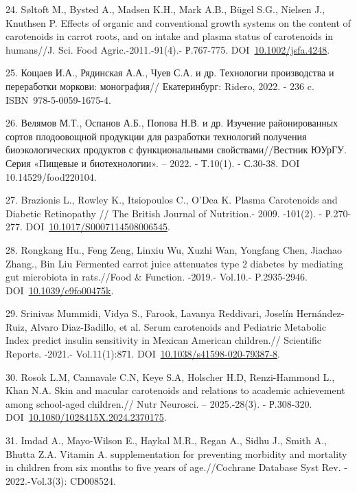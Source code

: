 24. Søltoft M., Bysted A., Madsen K.H., Mark A.B., Bügel S.G., Nielsen
J., Knuthsen P. Effects of organic and conventional growth systems on
the content of carotenoids in carrot roots, and on intake and plasma
status of carotenoids in humans//J. Sci. Food Agric.-2011.-91(4).-
Р.767-775.
DOI~\href{https://doi.org/10.1002/jsfa.4248}{10.1002/jsfa.4248}.

25. Кощаев И.А., Рядинская А.А., Чуев С.А. и др. Технологии производства
и переработки моркови: монография// Екатеринбург: Ridero, 2022. - 236 c.
ISBN~978-5-0059-1675-4.

26. Велямов М.Т., Оспанов А.Б., Попова Н.В. и др. Изучение
районированных сортов плодоовощной продукции для разработки технологий
получения биоэкологических продуктов с функциональными
свойствами//Вестник ЮУрГУ. Серия «Пищевые и биотехнологии». -- 2022. -
Т.10(1). - С.30-38. DOI 10.14529/food220104.

27. Brazionis L., Rowley K., Itsiopoulos C., O'Dea K. Plasma Carotenoids
and Diabetic Retinopathy // The British Journal of Nutrition.- 2009.
-101(2). - Р.270-277.
DOI~\href{https://doi.org/10.1017/s0007114508006545}{10.1017/S0007114508006545}.

28. Rongkang Hu., Feng Zeng, Linxiu Wu, Xuzhi Wan, Yongfang Chen,
Jiachao Zhang., Bin Liu Fermented carrot juice attenuates type 2
diabetes by mediating gut microbiota in rats.//Food \& Function. -2019.-
Vol.10.- P.2935-2946.
DOI~\href{https://doi.org/10.1039/c9fo00475k}{10.1039/c9fo00475k}.

29. Srinivas Mummidi, Vidya S., Farook, Lavanya Reddivari, Joselín
Hernández-Ruiz, Alvaro Diaz-Badillo, et al. Serum carotenoids and
Pediatric Metabolic Index predict insulin sensitivity in Mexican
American children.// Scientific Reports. -2021.- Vol.11(1):871.
DOI~\href{https://doi.org/10.1038/s41598-020-79387-8}{10.1038/s41598-020-79387-8}.

30. Rosok L.M, Cannavale C.N, Keye S.A, Holscher H.D, Renzi-Hammond L.,
Khan N.A. Skin and macular carotenoids and relations to academic
achievement among school-aged children.// Nutr Neurosci. -- 2025.-28(3).
- Р.308-320.
DOI~\href{https://doi.org/10.1080/1028415x.2024.2370175}{10.1080/1028415X.2024.2370175}.

31. Imdad A., Mayo-Wilson E., Haykal M.R., Regan A., Sidhu J., Smith A.,
Bhutta Z.A. Vitamin A. supplementation for preventing morbidity and
mortality in children from six months to five years of age.//Cochrane
Database Syst Rev. - 2022.-Vol.3(3): CD008524.

